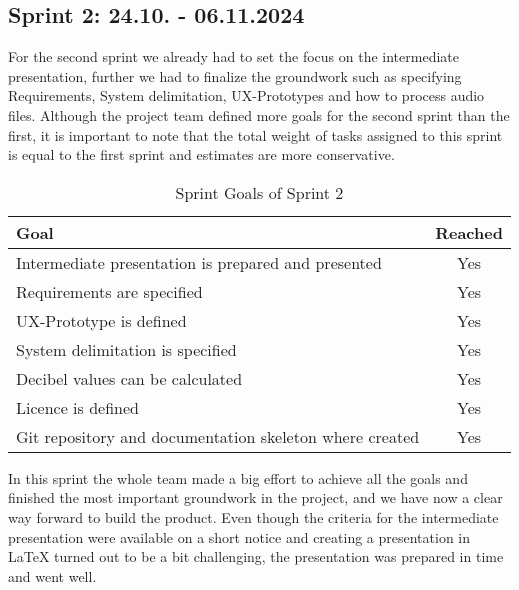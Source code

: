 \subsection{Sprint 2: 24.10. - 06.11.2024}\label{subsec:sprint-2}
For the second sprint we already had to set the focus on the intermediate presentation, further we had to finalize the
groundwork such as specifying Requirements, System delimitation, UX-Prototypes and how to process audio files.
Although the project team defined more goals for the second sprint than the first, it is important to note that the total weight of tasks assigned to this
sprint is equal to the first sprint and estimates are more conservative.
\begin{table}[H]
    \centering
    \begin{tabularx}{\textwidth}{X c}
        \toprule
        \textbf{Goal}                                         & \textbf{Reached} \\
        \midrule
        Intermediate presentation is prepared and presented   & Yes              \\
        \midrule
        Requirements are specified                            & Yes              \\
        \midrule
        UX-Prototype is defined                               & Yes              \\
        \midrule
        System delimitation is specified                      & Yes              \\
        \midrule
        Decibel values can be calculated                      & Yes              \\
        \midrule
        Licence is defined                                    & Yes              \\
        \midrule
        Git repository and documentation skeleton where created & Yes            \\
        \bottomrule
    \end{tabularx}
    \caption{Sprint Goals of Sprint 2}\label{tab:sprint_goals2}
\end{table}
In this sprint the whole team made a big effort to achieve all the goals and finished the most important groundwork in
the project, and we have now a clear way forward to build the product.
Even though the criteria for the intermediate presentation were available on a short notice and creating a presentation
in LaTeX turned out to be a bit challenging, the presentation was prepared in time and went well.

